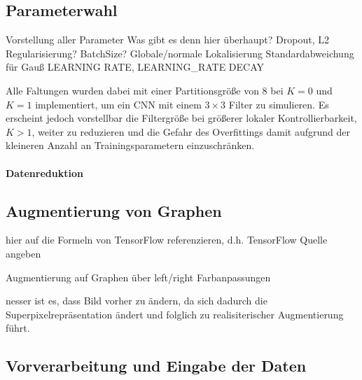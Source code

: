 \subsection{Parameterwahl}
\label{parameterwahl}

Vorstellung aller Parameter
Was gibt es denn hier überhaupt?
Dropout, L2 Regularisierung?
BatchSize?
Globale/normale Lokalisierung
Standardabweichung für Gauß
LEARNING RATE, LEARNING_RATE DECAY

Alle Faltungen wurden dabei mit einer Partitionsgröße von $8$ bei $K=0$ und $K=1$ implementiert, um ein \gls{CNN} mit einem $3 \times 3$ Filter zu simulieren.
Es erscheint jedoch vorstellbar die Filtergröße bei größerer lokaler Kontrollierbarkeit, \dhe{} $K > 1$, weiter zu reduzieren und die Gefahr des Overfittings damit aufgrund der kleineren Anzahl an Trainingsparametern einzuschränken.

\paragraph{Datenreduktion}
\label{datenreduktion}

\subsection{Augmentierung von Graphen}
\label{augmentierung_von_graphen}

hier auf die Formeln von TensorFlow referenzieren, d.h. TensorFlow Quelle angeben
\cite{tensorflow}

Augmentierung auf Graphen über left/right
Farbanpassungen


nesser ist es, dass Bild vorher zu ändern, da sich dadurch die Superpixelrepräsentation ändert
und folglich zu realisiterischer Augmentierung führt.

\subsection{Vorverarbeitung und Eingabe der Daten}
\label{vorverarbeitung}
